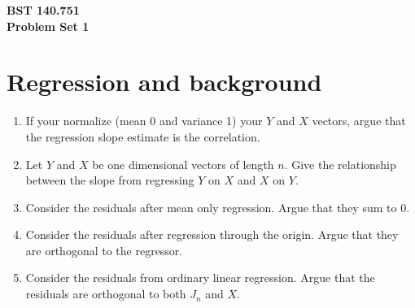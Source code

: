 \documentclass[12pt]{article}
\begin{document}
\noindent
{\bf BST 140.751 \\ Problem Set 1} \\

\section{Regression and background}
\begin{enumerate}[1.]
\item If your normalize (mean 0 and variance 1) your $Y$ and $X$ vectors,
argue that the regression slope estimate is the correlation.
\item Let $Y$ and $X$ be one dimensional vectors of length $n$. Give
the relationship between the slope from regressing $Y$ on $X$ and $X$
on $Y$.
\item Consider the residuals after mean only regression. Argue
that they sum to 0.
\item Consider the residuals after regression through the origin.
Argue that they are orthogonal to the regressor.
\item Consider the residuals from ordinary linear regression. Argue
that the residuals are orthogonal to both $J_n$ and $X$.
\end{enumerate}
\end{document}

